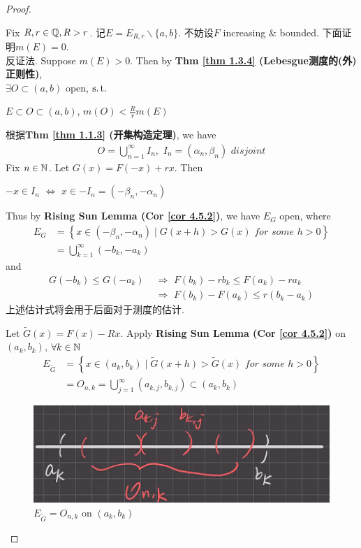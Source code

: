 \begin{thm}
\begin{proof}
\begin{enumerate}
				\vspace{1em}
				Fix $R , r \in \mathbb{Q} , R > r$. 记$E = E_{R , r} \backslash \{ a , b \}$. 不妨设$F$ increasing $\&$ bounded. 下面证明$m(E) = 0$. \\
				反证法. Suppose $m(E) > 0$. Then by \textbf{Thm \ref{thm 1.3.4} (Lebesgue测度的(外)正则性)}, \\
				$\exists O \subset (a , b)$ open, $\operatorname{s.t.}$
				\begin{center}
					$E \subset O \subset (a , b)$, $m(O) < \frac{R}{r}m(E)$
				\end{center}
				根据\textbf{Thm \ref{thm 1.1.3} (开集构造定理)}, we have
				\begin{align}
					O = \bigcup_{n = 1}^{\infty}{I_n} , \,\, I_n = (\alpha_n , \beta_n) \,\, disjoint
				\end{align}
				Fix $n \in \mathbb{N}$. Let $G(x) = F(-x) + rx$. Then
				\begin{center}
					$-x \in I_n \,\, \Leftrightarrow \,\, x \in -I_n = (-\beta_n , -\alpha_n)$
				\end{center}
				Thus by \textbf{Rising Sun Lemma (Cor \ref{cor 4.5.2})}, we have $E_G$ open, where
				\begin{align}
					E_G
					&= \left\{ x \in (-\beta_n , -\alpha_n) \mid G(x + h) > G(x) \,\, for \,\, some \,\, h > 0 \right\} \\
					&= \bigcup_{k = 1}^{\infty}{(-b_k , -a_k)}
				\end{align}
				and 
				\begin{align}
					G(-b_k) \leq G(-a_k) \,\, &\Rightarrow \,\, F(b_k) - rb_k \leq F(a_k) - ra_k \\
					&\Rightarrow \,\, F(b_k) - F(a_k) \leq r(b_k - a_k)
				\end{align}
				上述估计式将会用于后面对于测度的估计.
				
				\newpage
				Let $\widetilde{G}(x) = F(x) - Rx$. Apply \textbf{Rising Sun Lemma (Cor \ref{cor 4.5.2})} on $(a_k , b_k)$, $\forall k \in \mathbb{N}$
				\begin{align}
					E_{\widetilde{G}} 
					&= \left\{ x \in (a_k , b_k) \mid \widetilde{G}(x + h) > \widetilde{G}(x) \,\, for \,\, some \,\, h > 0 \right\} \\
					&= O_{n , k}
					= \bigcup_{j = 1}^{\infty}{(a_{k , j} , b_{k , j})}
					\subset (a_k , b_k)
				\end{align}
				
				\begin{figure}[thbp!]
					\centering
					\includegraphics[width=0.35\linewidth]{figure/4.6.1-1}
					\caption{$E_{\widetilde{G}} = O_{n , k}$ on $(a_k , b_k)$}
					\label{pic : 4.6.1-1} %
				\end{figure}
				

\end{enumerate}
\end{proof}
\end{thm}
